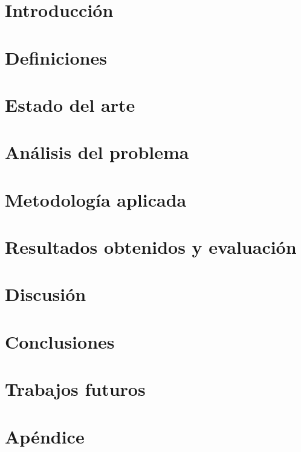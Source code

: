 \documentclass[twoside,spanish,a4paper,12pt]{tfg}
\begin{document}
\chapter{Introducción}
\label{chapter:1}


\chapter{Definiciones}
\label{chapter:2}


\chapter{Estado del arte}
\label{chapter:3}


\chapter{Análisis del problema}
\label{chapter:4}


\chapter{Metodología aplicada}
\label{chapter:5}


\chapter{Resultados obtenidos y evaluación}
\label{chapter:6}


\chapter{Discusión}
\label{chapter:7}


\chapter{Conclusiones}
\label{chapter:8}


\chapter{Trabajos futuros}



\nocite{*}

\pagestyle{bib}
\printbibliography
\label{Bibliografía}
% 
% 

\pagestyle{appendix}
\appendix
\chapter{Apéndice}

\end{document}
